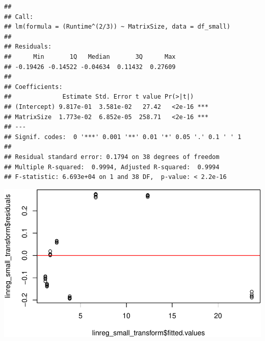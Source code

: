 \documentclass[
]{article}
\newenvironment{Shaded}{\begin{snugshade}}{\end{snugshade}}
\newcommand{\CommentTok}[1]{\textcolor[rgb]{0.56,0.35,0.01}{\textit{#1}}}
\newcommand{\DataTypeTok}[1]{\textcolor[rgb]{0.13,0.29,0.53}{#1}}
\newcommand{\DecValTok}[1]{\textcolor[rgb]{0.00,0.00,0.81}{#1}}
\newcommand{\KeywordTok}[1]{\textcolor[rgb]{0.13,0.29,0.53}{\textbf{#1}}}
\newcommand{\NormalTok}[1]{#1}
\newcommand{\OperatorTok}[1]{\textcolor[rgb]{0.81,0.36,0.00}{\textbf{#1}}}
\newcommand{\StringTok}[1]{\textcolor[rgb]{0.31,0.60,0.02}{#1}}
\begin{document}
\begin{verbatim}
## 
## Call:
## lm(formula = (Runtime^(2/3)) ~ MatrixSize, data = df_small)
## 
## Residuals:
##      Min       1Q   Median       3Q      Max 
## -0.19426 -0.14522 -0.04634  0.11432  0.27609 
## 
## Coefficients:
##              Estimate Std. Error t value Pr(>|t|)    
## (Intercept) 9.817e-01  3.581e-02   27.42   <2e-16 ***
## MatrixSize  1.773e-02  6.852e-05  258.71   <2e-16 ***
## ---
## Signif. codes:  0 '***' 0.001 '**' 0.01 '*' 0.05 '.' 0.1 ' ' 1
## 
## Residual standard error: 0.1794 on 38 degrees of freedom
## Multiple R-squared:  0.9994, Adjusted R-squared:  0.9994 
## F-statistic: 6.693e+04 on 1 and 38 DF,  p-value: < 2.2e-16
\end{verbatim}

\begin{Shaded}
\end{Shaded}

\includegraphics{main_files/figure-latex/unnamed-chunk-16-3.pdf}

\begin{Shaded}
\end{Shaded}
\end{document}
